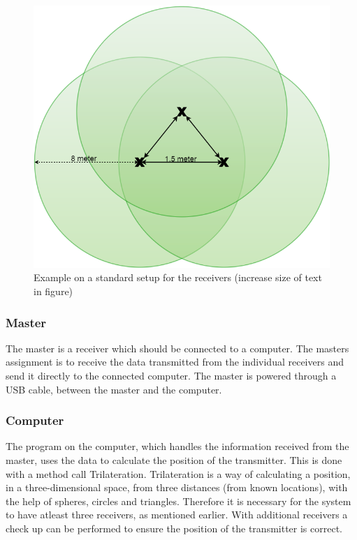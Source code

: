 \begin{figure}[H]
	\centering
	\includegraphics[scale=0.5]{figures/ReceiverSetup.png}
	\caption{Example on a standard setup for the receivers (increase size of text in figure)}
	\label{receiverSetup}
\end{figure}

\subsubsection{Master}
The master is a receiver which should be connected to a computer. The masters assignment is to receive the data transmitted from the individual receivers and send it directly to the connected computer. The master is powered through a USB cable, between the master and the computer.
\subsubsection{Computer}

The program on the computer, which handles the information received from the master, uses the data to calculate the position of the transmitter. This is done with a method call Trilateration. Trilateration is a way of calculating a position, in a three-dimensional space, from three distances (from known locations), with the help of spheres, circles and triangles. Therefore it is necessary for the system to have atleast three receivers, as mentioned earlier. With additional receivers a check up can be performed to ensure the position of the transmitter is correct.\\\\

